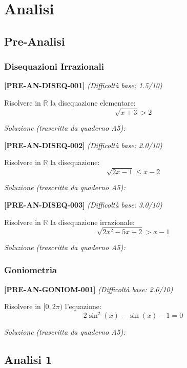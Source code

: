 \documentclass[11pt,a4paper]{book}
\newenvironment{esercizio}[2]{%
  \par\medskip\noindent\textbf{[#1]} \textit{(Difficoltà base: #2/10)}\par\noindent\ignorespaces
}{\par\medskip}
\newenvironment{soluzione}{%
  \par\noindent\textit{Soluzione (trascritta da quaderno A5):}\par\noindent\ignorespaces
}{\par\bigskip}
\begin{document}
\part{Analisi}

\chapter{Pre-Analisi}

\section{Disequazioni Irrazionali}

\begin{esercizio}{PRE-AN-DISEQ-001}{1.5}
Risolvere in $\mathbb{R}$ la disequazione elementare:
$$\sqrt{x + 3} > 2$$
\end{esercizio}
\begin{soluzione}
\end{soluzione}

\begin{esercizio}{PRE-AN-DISEQ-002}{2.0}
Risolvere in $\mathbb{R}$ la disequazione:
$$\sqrt{2x - 1} \le x - 2$$
\end{esercizio}
\begin{soluzione}
\end{soluzione}

\begin{esercizio}{PRE-AN-DISEQ-003}{3.0}
Risolvere in $\mathbb{R}$ la disequazione irrazionale:
$$\sqrt{2x^2 - 5x + 2} > x - 1$$
\end{esercizio}
\begin{soluzione}
\end{soluzione}

\section{Goniometria}

\begin{esercizio}{PRE-AN-GONIOM-001}{2.0}
Risolvere in $[0, 2\pi)$ l'equazione:
$$2\sin^2(x) - \sin(x) - 1 = 0$$
\end{esercizio}
\begin{soluzione}
\end{soluzione}

\chapter{Analisi 1}
\end{document}
